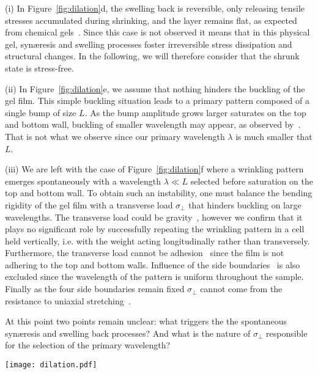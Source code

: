 \documentclass[twocolumn,superscriptaddress,showpacs,preprintnumbers,
amsmath,amssymb,prl]{revtex4-1}
\begin{document}
\noindent
(i) In Figure~\ref{fig:dilation}d, the swelling back is reversible, only releasing tensile stresses accumulated during shrinking, and the layer remains flat, as expected from chemical gels~\cite{Kim2010}. Since this case is not observed it means that in this physical gel, syn\ae{}resis and swelling processes foster irreversible stress dissipation and structural changes. In the following, we will therefore consider that the shrunk state is stress-free. 

\noindent
(ii) In Figure~\ref{fig:dilation}e, we assume that nothing hinders the buckling of the gel film. This simple buckling situation leads to a primary pattern composed of a single bump of size $L$. As the bump amplitude grows larger saturates on the top and bottom wall, buckling of smaller wavelength may appear, as observed by~\cite{Roman1999}. That is not what we observe since our primary wavelength $\lambda$ is much smaller that $L$.

\noindent
(iii) We are left with the case of Figure~\ref{fig:dilation}f where a wrinkling pattern emerges spontaneously with a wavelength $\lambda\ll L$ selected before saturation on the top and bottom wall. To obtain such an instability, one must balance the bending rigidity of the gel film with a transverse load $\sigma_{\perp}$ that hinders buckling on large wavelengths. The transverse load could be gravity~\cite{Smoluchowski1910, Kolinski2009, Vella2009, Pineirua2013, Lucantonio2013}, however we confirm that it plays no significant role by successfully repeating the wrinkling pattern in a cell held vertically, i.e. with the weight acting longitudinally rather than transversely. Furthermore, the transverse load cannot be adhesion~\cite{Vella2009a} since the film is not adhering to the top and bottom walls. Influence of the side boundaries~\cite{Vandeparre2011a, Li2013} is also excluded since the wavelength of the pattern is uniform throughout the sample. Finally as the four side boundaries remain fixed $\sigma_{\perp}$ cannot come from the resistance to uniaxial stretching~\cite{Cerda2003}.

At this point two points remain unclear: what triggers the the spontaneous syn\ae{}resis and swelling back processes? And what is the nature of $\sigma_{\perp}$ responsible for the selection of the primary wavelength?

\begin{figure*}
\texttt{[image: dilation.pdf]}
\caption{The wrinkling experiment. (a) Initial configuration where the sealed cell contains an homogeneous protein solution. (b) Around the isoelectric pH, the gel forms and immediately expels solvent leading to (c). If tensile stresses were not released we would observe reversible swelling back leading to (d) a flat swollen gel layer. If tensile stresses are released, swelling back leads either to buckling (e) or to wrinkling (f) depending whether the bending is free or hindered by a transverse load.}
\label{fig:dilation}
\end{figure*}
\end{document}
